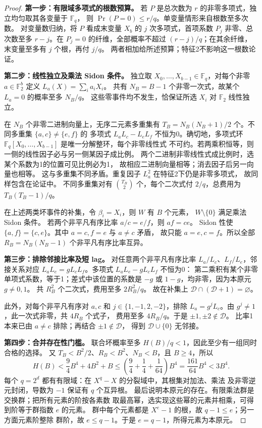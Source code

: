 \begin{proof}
\textbf{第一步：有限域多项式的根数预算。}
若 $P$ 是总次数为 $r$ 的非零多项式，独立均匀取其各变量于 $\mathbb F_q$，
则 $\Pr(P=0)\le r/q$。单变量情形来自根数至多次数。
对变量数归纳，将 $P$ 看成末变量 $X_b$ 的 $j$ 次多项式，首项系数
$P_j$ 非零、总次数至多 $r-j$。在 $P_j=0$ 的纤维，全部概率不超过
$(r-j)/q$；在其余纤维，末变量至多有 $j$ 个根，再付 $j/q$。
两者相加给所述预算；特征2不影响这一根数论证。

\textbf{第二步：线性独立及乘法 Sidon 条件。}
独立取 $X_0,\ldots,X_{b-1}\in\mathbb F_q$，对每个非零
$a\in\mathbb F_2^b$ 定义 $L_a(X)=\sum_i a_iX_i$。
共有 $N_B=B-1$ 个非零一次式，故某个 $L_a=0$ 的概率至多 $N_B/q$。
这些零事件均不发生，恰保证所选 $X_i$ 对 $\mathbb F_2$ 线性独立。

在 $N_B$ 个非零二进制向量上，无序二元素多重集有
$T_B=N_B(N_B+1)/2$ 个。不同多重集 $\{a,c\}\ne\{e,f\}$ 的
多项式 $L_aL_c-L_eL_f$ 不恒为0。确切地，多项式环
$\mathbb F_q[X_0,\ldots,X_{b-1}]$ 是唯一分解整环，每个非零线性式
不可约。若两乘积恒等，则一侧的线性因子必与另一侧某因子成比例。
两个二进制非零线性式成比例时，选某个系数为1的位置可见比例必为1，
故相应二进制向量相等；消去因子后另一向量也相等。
这与多重集不同矛盾。重复因子 $L_a^2$ 在特征2下仍是非零多项式，
故同样包含在论证中。
不同多重集对有 $\binom{T_B}{2}$ 个，每个二次式付 $2/q$，总费用为
$T_B(T_B-1)/q$。

在上述两类坏事件的补集，令 $\beta_i=X_i$，则 $W$ 有 $B$ 个元素，
$W\setminus\{0\}$ 满足乘法 Sidon 条件。
若两个非平凡有序比率 $a/c=e/f$，则 $af=ce$。
Sidon 性使 $\{a,f\}=\{c,e\}$。其中 $a=c,f=e$ 与 $a\ne c$ 矛盾，
故只能 $a=e,c=f$。所以全部 $R_B=N_B(N_B-1)$ 个非平凡有序比率互异。

\textbf{第三步：排除邻接比率及短 lag。}
对任意两个非平凡有序比率 $L_a/L_c$、$L_f/L_e$，邻接关系对应
$L_aL_e=gL_cL_f$。多项式 $L_aL_e-gL_cL_f$ 不恒为0：
第二乘积有某个非零单项式系数，等于1；差式中该位置的系数是
$-g$ 或 $1-g$，均非零，因为本原元 $g\ne0,1$。
共 $R_B^2$ 个二次式，费用至多 $2R_B^2/q$。
故在补集上 $\mathcal D\cap(\mathcal D+1)=\varnothing$。

此外，对每个非平凡有序对 $a,c$ 和 $j\in\{1,-1,2,-2\}$，排除
$L_a=g^jL_c$。由 $g^j\ne1$，此一次式非零，共 $4R_B$ 个式子，
费用至多 $4R_B/q$。于是 $\pm1,\pm2\notin\mathcal D$。
比率1本来已由 $a\ne c$ 排除；再结合 $\pm1\notin\mathcal D$，
得到 $\mathcal D\cup\{0\}$ 无邻接。

\textbf{第四步：合并存在性门槛。}
联合坏概率至多 $H(B)/q<1$，因此至少有一组同时合格的选择。
又 $T_B<B^2/2$、$R_B<B^2$、$N_B<B$，且 $B\ge4$，所以
\[
 H(B)<\frac94B^4+4B^2+B
 \le\left(\frac94+\frac14+\frac1{64}\right)B^4
 =\frac{161}{64}B^4<3B^4.
\]
每个 $q=2^d$ 都有有限域：在 $X^q-X$ 的分裂域中，其根集对加法、乘法
及非零逆元封闭，导数为 $-1$ 保证有 $q$ 个互异根。
最后说明本原元的存在。有限乘法群是交换群；把所有元素的阶按各素数
取最高幂，选实现这些幂的元素并相乘，可得到阶等于群指数 $e$ 的元素。
群中每个元素都是 $X^e-1$ 的根，故 $q-1\le e$；另一方面元素阶整除
群阶，故 $e\le q-1$。于是 $e=q-1$，所得元素为本原元。
\end{proof}

